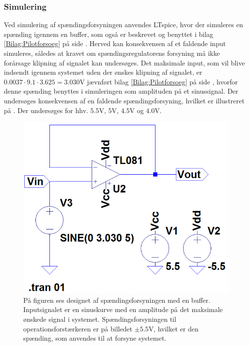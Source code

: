 \subsubsection{Simulering}
Ved simulering af spændingsforsyningen anvendes LTspice, hvor der simuleres en spænding igennem en buffer, som også er beskrevet og benyttet i bilag \ref{Bilag:Pilotforsoeg} på side \pageref{Bilag:Pilotforsoeg}. Herved kan konsekvensen af et faldende input simuleres, således at kravet om spændingsregulatorens forsyning må ikke forårsage klipning af signalet kan undersøges. Det maksimale input, som vil blive indsendt igennem systemet uden der ønskes klipning af signalet, er $0.0037 \cdot 9.1 \cdot 3.6 25 = 3.030$V jævnført bilag \ref{Bilag:Pilotforsoeg} på side \pageref{Bilag:Pilotforsoeg}, hvorfor denne spænding benyttes i simuleringen som amplituden på et sinussignal. Der undersøges konsekvensen af en faldende spændingsforsyning, hvilket er illustreret på . Der undersøges for hhv. $5.5$V, $5$V, $4.5$V og $4.0$V.
\begin{figure}[H]
	\centering
	\includegraphics[scale=0.4]{figures/cProblemloesning/Spaendingsforsyning_LTspice2.PNG}
	\caption{På figuren ses designet af spændingsforsyningen med en buffer. Inputsignalet er en sinuskurve med en amplitude på det maksimale ønskede signal i systemet. Spændingsforsyningen til operationsforstærkeren er på billedet $\pm5.5$V, hvilket er den spænding, som anvendes til at forsyne systemet.}
	\label{fig:spaendingsforsyning}
\end{figure}
